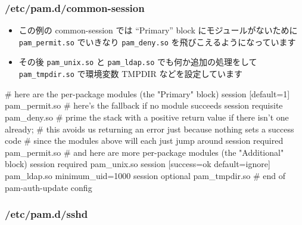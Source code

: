 \documentclass[mingoth,a4paper]{jsarticle}
\begin{document}
\subsubsection{/etc/pam.d/common-session}
\label{sec-1-6-2}

\begin{itemize}
\item この例の common-session では ``Primary'' block にモジュールがないために \verb~pam_permit.so~ でいきなり \verb~pam_deny.so~ を飛びこえるようになっています
\item その後 \verb~pam_unix.so~ と \verb~pam_ldap.so~ でも何か追加の処理をして \verb~pam_tmpdir.so~ で環境変数 TMPDIR などを設定しています
\end{itemize}

\begin{commandline}
# here are the per-package modules (the "Primary" block)
session [default=1]                     pam_permit.so
# here's the fallback if no module succeeds
session requisite                       pam_deny.so
# prime the stack with a positive return value if there isn't one already;
# this avoids us returning an error just because nothing sets a success code
# since the modules above will each just jump around
session required                        pam_permit.so
# and here are more per-package modules (the "Additional" block)
session required        pam_unix.so
session [success=ok default=ignore]     pam_ldap.so minimum_uid=1000
session optional pam_tmpdir.so
# end of pam-auth-update config
\end{commandline}
\subsubsection{/etc/pam.d/sshd}
\label{sec-1-6-3}
\end{document}
